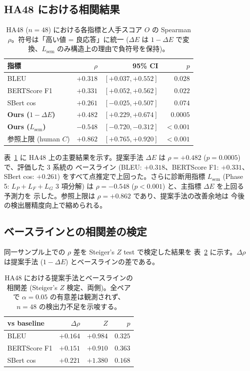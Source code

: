 \subsection{HA48 における相関結果}
\label{sec:exp:results}

\begin{table}[t]
\centering
\caption{HA48 ($n = 48$) における各指標と人手スコア $O$ の Spearman
$\rho$。符号は「高い値 = 良応答」に統一 ($\Delta E$ は $1 - \Delta E$
で変換、$L_{\mathrm{sem}}$ のみ構造上の理由で負符号を保持)。}
\label{tab:ha48_correlation}
\begin{tabular}{lrrr}
\toprule
指標 & $\rho$ & 95\% CI & $p$ \\
\midrule
BLEU & $+0.318$ & $[+0.037, +0.552]$ & $0.028$ \\
BERTScore F1 & $+0.331$ & $[+0.052, +0.562]$ & $0.022$ \\
SBert cos & $+0.261$ & $[-0.025, +0.507]$ & $0.074$ \\
\midrule
\textbf{Ours ($1 - \Delta E$)} & $\bm{+0.482}$ & $\bm{[+0.229, +0.674]}$ & $\bm{0.0005}$ \\
\textbf{Ours ($L_{\mathrm{sem}}$)} & $\bm{-0.548}$ & $\bm{[-0.720, -0.312]}$ & $\bm{< 0.001}$ \\
\midrule
参照上限 (human $C$) & $+0.862$ & $[+0.765, +0.920]$ & $< 0.001$ \\
\bottomrule
\end{tabular}
\end{table}

表~\ref{tab:ha48_correlation} に HA48 上の主要結果を示す。提案手法
$\Delta E$ は $\rho = +0.482$ ($p = 0.0005$) で、評価した 3 系統の
ベースライン (BLEU: $+0.318$、BERTScore F1: $+0.331$、SBert cos:
$+0.261$) をすべて点推定で上回った。さらに診断用指標
$L_{\mathrm{sem}}$ (Phase 5: $L_P + L_F + L_G$ 3 項分解) は
$\rho = -0.548$ ($p < 0.001$) と、主指標 $\Delta E$ を上回る予測力を
示した。参照上限は $\rho = +0.862$ であり、提案手法の改善余地は
今後の検出層精度向上で縮められる。

\subsection{ベースラインとの相関差の検定}
\label{sec:exp:steiger}

同一サンプル上での $\rho$ 差を Steiger's $Z$ test で検定した結果を
表~\ref{tab:steiger} に示す。$\Delta \rho$ は提案手法 ($1 - \Delta E$)
とベースラインの差である。

\begin{table}[t]
\centering
\caption{HA48 における提案手法とベースラインの相関差 (Steiger's $Z$
検定、両側)。全ペアで $\alpha = 0.05$ の有意差は観測されず、
$n = 48$ の検出力不足を示唆する。}
\label{tab:steiger}
\begin{tabular}{lrrr}
\toprule
vs baseline & $\Delta \rho$ & $Z$ & $p$ \\
\midrule
BLEU & $+0.164$ & $+0.984$ & $0.325$ \\
BERTScore F1 & $+0.151$ & $+0.910$ & $0.363$ \\
SBert cos & $+0.221$ & $+1.380$ & $0.168$ \\
\bottomrule
\end{tabular}
\end{table}


